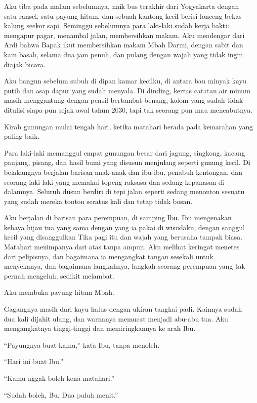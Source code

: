 \documentclass[11pt,twoside,openany]{book}
\makeatletter
\newcommand{\scenebreak}{\par\vspace{0.9em}{\centering\textsc{*\hspace{0.7em}*\hspace{0.7em}*}\par}\vspace{0.9em}\@afterindentfalse\@afterheading}
\makeatother
\begin{document}
Aku tiba pada malam sebelumnya, naik bus terakhir dari Yogyakarta dengan satu ransel, satu payung hitam, dan sebuah kantong kecil berisi lonceng bekas kalung seekor sapi. Seminggu sebelumnya para laki-laki sudah kerja bakti: mengapur pagar, menambal jalan, membersihkan makam. Aku mendengar dari Ardi bahwa Bapak ikut membersihkan makam Mbah Darmi, dengan sabit dan kain basah, selama dua jam penuh, dan pulang dengan wajah yang tidak ingin diajak bicara.

Aku bangun sebelum subuh di dipan kamar kecilku, di antara bau minyak kayu putih dan asap dapur yang sudah menyala. Di dinding, kertas catatan air minum masih menggantung dengan pensil bertambat benang, kolom yang sudah tidak ditulisi siapa pun sejak awal tahun 2030, tapi tak seorang pun mau mencabutnya.

\scenebreak
Kirab gunungan mulai tengah hari, ketika matahari berada pada kemarahan yang paling baik.

Para laki-laki memanggul empat gunungan besar dari jagung, singkong, kacang panjang, pisang, dan hasil bumi yang disusun menjulang seperti gunung kecil. Di belakangnya berjalan barisan anak-anak dan ibu-ibu, penabuh kentongan, dan seorang laki-laki yang memakai topeng raksasa dan sedang kepanasan di dalamnya. Seluruh dusun berdiri di tepi jalan seperti sedang menonton sesuatu yang sudah mereka tonton seratus kali dan tetap tidak bosan.

Aku berjalan di barisan para perempuan, di samping Ibu. Ibu mengenakan kebaya hijau tua yang sama dengan yang ia pakai di wisudaku, dengan sanggul kecil yang disanggulkan Tika pagi itu dan wajah yang berusaha tampak biasa. Matahari menimpanya dari atas tanpa ampun. Aku melihat keringat menetes dari pelipisnya, dan bagaimana ia mengangkat tangan sesekali untuk menyekanya, dan bagaimana langkahnya, langkah seorang perempuan yang tak pernah mengeluh, sedikit melambat.

Aku membuka payung hitam Mbah.

Gagangnya masih dari kayu halus dengan ukiran tangkai padi. Kainnya sudah dua kali dijahit ulang, dan warnanya memucat menjadi abu-abu tua. Aku mengangkatnya tinggi-tinggi dan memiringkannya ke arah Ibu.

``Payungnya buat kamu,'' kata Ibu, tanpa menoleh.

``Hari ini buat Ibu.''

``Kamu nggak boleh kena matahari.''

``Sudah boleh, Bu. Dua puluh menit.''
\end{document}
